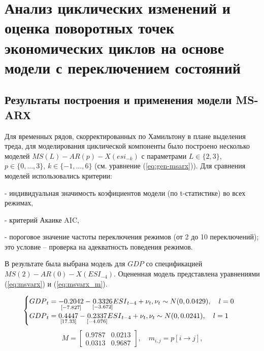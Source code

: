 \documentclass[a4paper,14pt]{extreport}
\begin{document}
	\section{Анализ циклических изменений и оценка поворотных точек экономических циклов на основе модели с переключением состояний}
	
	\subsection{Результаты построения и применения модели MS-ARХ}
	
	Для временных рядов, скорректированных по Хамильтону в плане выделения треда, для моделирования циклической компоненты было построено несколько моделей $MS(L)-AR(p)-X(esi_{-k})$ с параметрами $L \in \{2,3\}$, $p \in \{0, ..., 3\}$, $k \in \{-1, ..., 6\}$ (см. уравнение (\ref{eq:gen-msarx})). Для сравнения моделей использовались критерии:
	
	- индивидуальная значимость коэфициентов модели (по t-статистике) во всех режимах,
	
	- критерий Акаике AIC,
	
	- пороговое значение частоты переключения режимов (от 2 до 10 переключений); это условие -- проверка на адекватность поведения режимов.
	
	В результате была выбрана модель для ${GDP}$ со спецификацией $MS(2)-AR(0)-X({ESI}_{-4})$. Оцененная модель представлена уравнениями (\ref{eq:msvarx}) и (\ref{eq:msvarx_m}).
	
	{
		
		\begin{equation}
		\begin{cases}
		{GDP}_{t} = 
		\underset{[-7.827]}{-0.2042} 
		- \underset{[-3.672]}{0.3326} {ESI}_{t-4}
		+ \nu_{t} , \space \nu_{t} \sim N(0, 0.0429)
		, \quad l=0 \\
		{GDP}_{t} = 
		\underset{[17.33]}{0.4447}
		- \underset{[-4.076]}{0.2337} {ESI}_{t-4}
		+ \nu_{t} , \space \nu_{t} \sim N(0, 0.0241)
		, \quad l=1
		\end{cases}			
		\label{eq:msvarx}
		\end{equation}
		\begin{equation}
		M = 
		\begin{bmatrix}
		0.9787 & 0.0213 \\
		0.0313 & 0.9687
		\end{bmatrix}
		, \quad m_{i,j} = p[i \rightarrow j],
		\label{eq:msvarx_m}
		\end{equation}
		
	}
	
\end{document}
